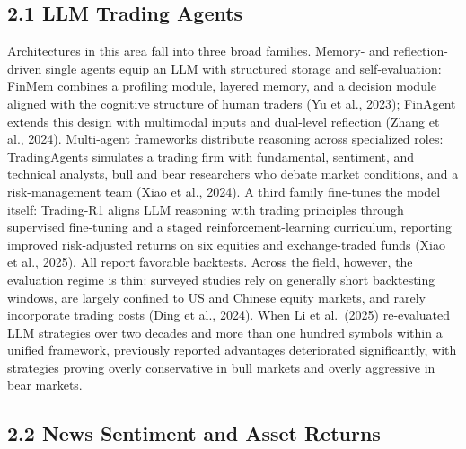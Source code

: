 \documentclass[
  12pt,
]{article}
\begin{document}
\hypertarget{llm-trading-agents}{%
\subsection{2.1 LLM Trading Agents}\label{llm-trading-agents}}

Architectures in this area fall into three broad families. Memory- and
reflection-driven single agents equip an LLM with structured storage and
self-evaluation: FinMem combines a profiling module, layered memory, and
a decision module aligned with the cognitive structure of human traders
(Yu et al., 2023); FinAgent extends this design with multimodal inputs
and dual-level reflection (Zhang et al., 2024). Multi-agent frameworks
distribute reasoning across specialized roles: TradingAgents simulates a
trading firm with fundamental, sentiment, and technical analysts, bull
and bear researchers who debate market conditions, and a risk-management
team (Xiao et al., 2024). A third family fine-tunes the model itself:
Trading-R1 aligns LLM reasoning with trading principles through
supervised fine-tuning and a staged reinforcement-learning curriculum,
reporting improved risk-adjusted returns on six equities and
exchange-traded funds (Xiao et al., 2025). All report favorable
backtests. Across the field, however, the evaluation regime is thin:
surveyed studies rely on generally short backtesting windows, are
largely confined to US and Chinese equity markets, and rarely
incorporate trading costs (Ding et al., 2024). When Li et al.~(2025)
re-evaluated LLM strategies over two decades and more than one hundred
symbols within a unified framework, previously reported advantages
deteriorated significantly, with strategies proving overly conservative
in bull markets and overly aggressive in bear markets.

\hypertarget{news-sentiment-and-asset-returns}{%
\subsection{2.2 News Sentiment and Asset
Returns}\label{news-sentiment-and-asset-returns}}
\end{document}
